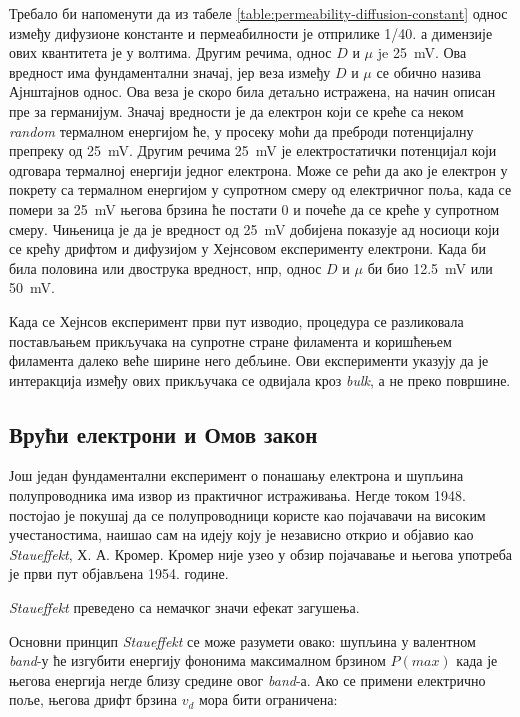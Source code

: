 \documentclass{article}
\begin{document}
Требало би напоменути да из табеле \ref{table:permeability-diffusion-constant} однос између дифузионе константе и пермеабилности је отприлике 1/40. а димензије ових квантитета је у волтима. Другим речима, однос $D$ и $\mu$ je \SI{25}{\milli\volt}. Ова вредност има фундаментални значај, јер веза између $D$ и $\mu$ се обично назива Ајнштајнов однос. Ова веза је скоро била детаљно истражена, на начин описан пре за германијум. Значај вредности је да електрон који се креће са неком \textit{random} термалном енергијом ће, у просеку моћи да преброди потенцијалну препреку од \SI{25}{\milli\volt}. Другим речима \SI{25}{\milli\volt} је електростатички потенцијал који одговара термалној енергији једног електрона. Може се рећи да ако је електрон у покрету са термалном енергијом у супротном смеру од електричног поља, када се помери за \SI{25}{\milli\volt} његова брзина ће постати 0 и почеће да се креће у супротном смеру. Чињеница је да је вредност од \SI{25}{\milli\volt} добијена показује ад носиоци који се крећу дрифтом и дифузијом у Хејнсовом експерименту електрони. Када би била половина или двострука вредност, нпр, однос $D$ и $\mu$ би био \SI{12.5}{\milli\volt} или \SI{50}{\milli\volt}.

Када се Хејнсов експеримент први пут изводио, процедура се разликовала постављањем прикључака на супротне стране филамента и коришћењем филамента далеко веће ширине него дебљине. Ови експерименти указују да је интеракција између ових прикључака се одвијала кроз \textit{bulk}, а не преко површине.


\subsection{Врући електрони и Омов закон}

Још један фундаментални експеримент о понашању електрона и шупљина полупроводника има извор из практичног истраживања. Негде током 1948. постојао је покушај да се полупроводници користе као појачавачи на високим учестаностима, наишао сам на идеју коју је независно открио и објавио као \textit{Staueffekt}, Х. А. Кромер. Кромер није узео у обзир појачавање и његова употреба је први пут објављена 1954. године.

\begin{info}
    \textit{Staueffekt} преведено са немачког значи ефекат загушења. 
\end{info}


Основни принцип \textit{Staueffekt} се може разумети овако: шупљина у валентном \textit{band}-у ће изгубити енергију фононима максималном брзином $P(max)$ када је његова енергија негде близу средине овог \textit{band}-а. Ако се примени електрично поље, његова дрифт брзина $v_d$ мора бити ограничена:
\end{document}
